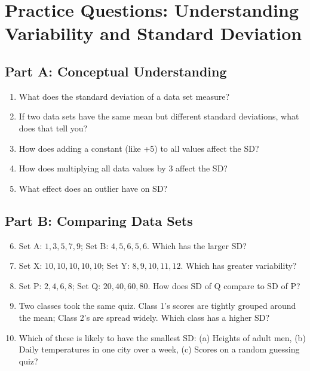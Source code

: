 \documentclass[12pt]{article}
\begin{document}
\newpage


\section*{Practice Questions: Understanding Variability and Standard Deviation}

\subsection*{Part A: Conceptual Understanding}
\begin{enumerate}
  \item What does the standard deviation of a data set measure?
  \item If two data sets have the same mean but different standard deviations, what does that tell you?
  \item How does adding a constant (like +5) to all values affect the SD?
  \item How does multiplying all data values by 3 affect the SD?
  \item What effect does an outlier have on SD?
\end{enumerate}

\subsection*{Part B: Comparing Data Sets}
\begin{enumerate}
  \setcounter{enumi}{5}
  \item Set A: \(1, 3, 5, 7, 9\); Set B: \(4, 5, 6, 5, 6\). Which has the larger SD?
  \item Set X: \(10, 10, 10, 10, 10\); Set Y: \(8, 9, 10, 11, 12\). Which has greater variability?
  \item Set P: \(2, 4, 6, 8\); Set Q: \(20, 40, 60, 80\). How does SD of Q compare to SD of P?
  \item Two classes took the same quiz. Class 1’s scores are tightly grouped around the mean; Class 2’s are spread widely. Which class has a higher SD?
  \item Which of these is likely to have the smallest SD:  
  (a) Heights of adult men, (b) Daily temperatures in one city over a week, (c) Scores on a random guessing quiz?
\end{enumerate}
\end{document}
